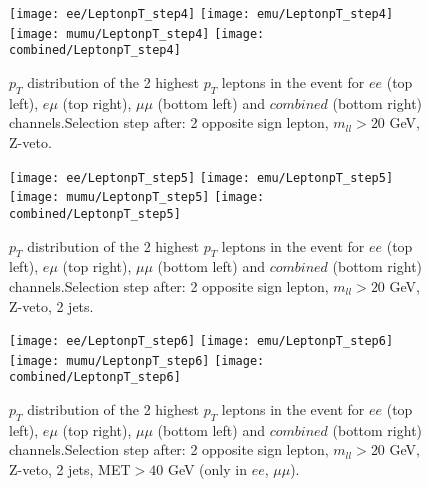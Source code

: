 \documentclass[12pt, a4paper, titlepage]{article}
\begin{document}
\clearpage
\newpage


\begin{figure}
  \texttt{[image: ee/LeptonpT\_step4]}
  \texttt{[image: emu/LeptonpT\_step4]}\\
  \texttt{[image: mumu/LeptonpT\_step4]}
  \texttt{[image: combined/LeptonpT\_step4]}
\caption{$p_T$ distribution of the 2 highest $p_T$ leptons in the event for $ee$ (top left), $e\mu$ (top right), $\mu\mu$ (bottom left) and $combined$ (bottom right) channels.\newline Selection step after: 2 opposite sign lepton, $m_{ll}>20$ GeV, Z-veto.}
\end{figure}

\clearpage
\newpage


\begin{figure}
  \texttt{[image: ee/LeptonpT\_step5]}
  \texttt{[image: emu/LeptonpT\_step5]}\\
  \texttt{[image: mumu/LeptonpT\_step5]}
  \texttt{[image: combined/LeptonpT\_step5]}
\caption{$p_T$ distribution of the 2 highest $p_T$ leptons in the event for $ee$ (top left), $e\mu$ (top right), $\mu\mu$ (bottom left) and $combined$ (bottom right) channels.\newline Selection step after: 2 opposite sign lepton, $m_{ll}>20$ GeV, Z-veto, 2 jets.}
\end{figure}

\clearpage
\newpage


\begin{figure}
  \texttt{[image: ee/LeptonpT\_step6]}
  \texttt{[image: emu/LeptonpT\_step6]}\\
  \texttt{[image: mumu/LeptonpT\_step6]}
  \texttt{[image: combined/LeptonpT\_step6]}
\caption{$p_T$ distribution of the 2 highest $p_T$ leptons in the event for $ee$ (top left), $e\mu$ (top right), $\mu\mu$ (bottom left) and $combined$ (bottom right) channels.\newline Selection step after: 2 opposite sign lepton, $m_{ll}>20$ GeV, Z-veto, 2 jets, MET$>40$ GeV (only in $ee$, $\mu\mu$).}
\end{figure}

\clearpage
\newpage
\end{document}
